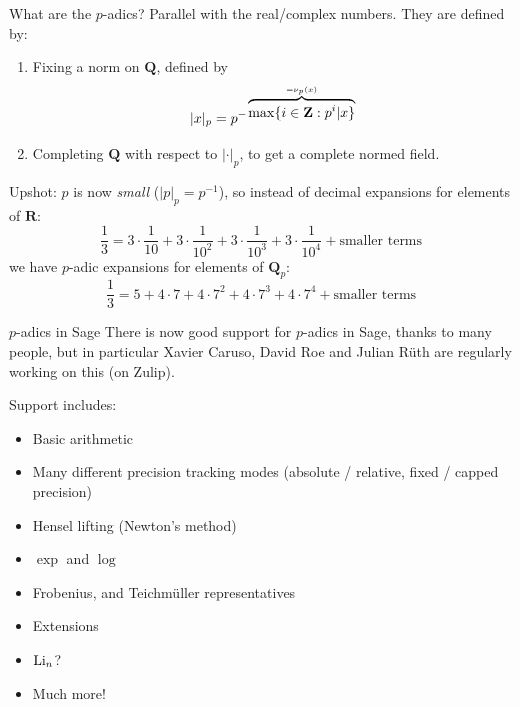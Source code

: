 \begin{frame}{What are the $p$-adics?}
    Parallel with the real/complex numbers. They are defined by:

    \begin{enumerate}
        \item Fixing a norm on $\mathbf Q$, defined by \[|x|_p = p^{-\overbrace{\max\{ i \in \mathbf{Z} : p^i | x\}}^{=\nu_p(x)}}\]
        \item Completing $\mathbf Q$ with respect to $| \cdot|_p$, to get a complete normed field.
    \end{enumerate} \pause

    Upshot: $p$ is now \emph{small} ($|p|_p = p^{-1}$), so instead of decimal expansions for elements of $\mathbf R$:
    \[\frac13= 3\cdot \frac{1}{10} + 3\cdot \frac{1}{10^2} +  3\cdot \frac{1}{10^3} +  3\cdot \frac{1}{10^4} +  \text{smaller terms}\]
    we have $p$-adic expansions for elements of $\mathbf Q_p$:
    \[\frac13 = 5 + 4 \cdot 7 + 4 \cdot 7^{2} + 4 \cdot 7^{3} + 4 \cdot 7^{4} + \text{smaller terms}\]
\end{frame}

\begin{frame}{$p$-adics in Sage}
    There is now good support for $p$-adics in Sage, thanks to many people, but in particular Xavier Caruso, David Roe and Julian Rüth are regularly working on this (on Zulip).\pause

    Support includes:
    \begin{itemize}
        \item Basic arithmetic
        \item Many different precision tracking modes (absolute / relative, fixed / capped precision)
        \item Hensel lifting (Newton's method)
        \item $\exp$ and $\log$
        \item Frobenius, and Teichm\"uller representatives
        \item Extensions
        \item $\operatorname{Li}_n$?
        \item Much more!
    \end{itemize}
\end{frame}

